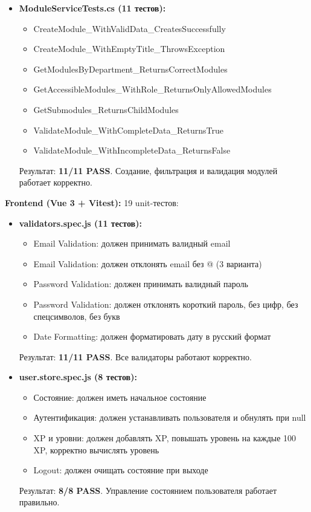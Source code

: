 \begin{itemize}
	\item \textbf{ModuleServiceTests.cs (11 тестов):}
	\begin{itemize}
		\item CreateModule\_WithValidData\_CreatesSuccessfully
		\item CreateModule\_WithEmptyTitle\_ThrowsException
		\item GetModulesByDepartment\_ReturnsCorrectModules
		\item GetAccessibleModules\_WithRole\_ReturnsOnlyAllowedModules
		\item GetSubmodules\_ReturnsChildModules
		\item ValidateModule\_WithCompleteData\_ReturnsTrue
		\item ValidateModule\_WithIncompleteData\_ReturnsFalse
	\end{itemize}
	Результат: \textbf{11/11 PASS}. Создание, фильтрация и валидация модулей работает корректно.
\end{itemize}

\textbf{Frontend (Vue 3 + Vitest):} 19 unit-тестов:
\begin{itemize}
	\item \textbf{validators.spec.js (11 тестов):}
	\begin{itemize}
		\item Email Validation: должен принимать валидный email
		\item Email Validation: должен отклонять email без @ (3 варианта)
		\item Password Validation: должен принимать валидный пароль
		\item Password Validation: должен отклонять короткий пароль, без цифр, без спецсимволов, без букв
		\item Date Formatting: должен форматировать дату в русский формат
	\end{itemize}
	Результат: \textbf{11/11 PASS}. Все валидаторы работают корректно.
	
	\item \textbf{user.store.spec.js (8 тестов):}
	\begin{itemize}
		\item Состояние: должен иметь начальное состояние
		\item Аутентификация: должен устанавливать пользователя и обнулять при null
		\item XP и уровни: должен добавлять XP, повышать уровень на каждые 100 XP, корректно вычислять уровень
		\item Logout: должен очищать состояние при выходе
	\end{itemize}
	Результат: \textbf{8/8 PASS}. Управление состоянием пользователя работает правильно.
\end{itemize}

